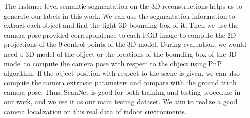 The instance-level semantic segmentation on the 3D reconstructions helps us to generate our labels in this work. We can use the segmentation information to extract each object and find the tight 3D bounding box of it. Then we use the camera pose provided correspondence to each RGB-image to compute the 2D projections of the 9 control points of the 3D model. During evaluation, we would need a 3D model of the object or the locations of the bounding box of the 3D model to compute the camera pose with respect to the object using PnP algorithm. If the object position with respect to the scene is given, we can also compute the camera extrinsic parameters and compare with the ground truth camera pose. Thus, ScanNet is good for both training and testing procedure in our work, and we use it  as our main testing dataset. We aim to realize a good camera localization on this real data of indoor environments.

